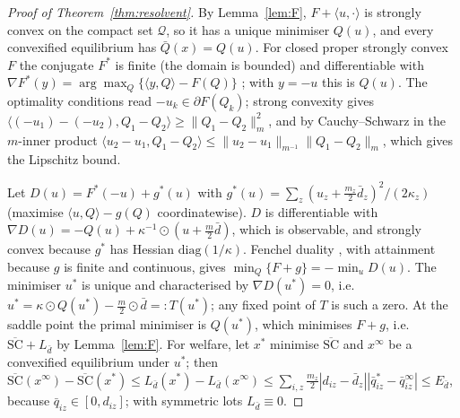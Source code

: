 \documentclass[preprint,12pt]{elsarticle}
\theoremstyle{definition}
\theoremstyle{remark}
\newcommand{\ip}[2]{\langle #1,#2\rangle}
\newcommand{\cQ}{\mathcal{Q}}
\begin{document}
\begin{proof}[Proof of Theorem~\ref{thm:resolvent}]
By Lemma~\ref{lem:F}, $F+\ip u\cdot$ is strongly convex on the compact set $\cQ$, so it has a unique minimiser $Q(u)$, and every convexified equilibrium has $\bar Q(x)=Q(u)$. For closed proper strongly convex $F$ the conjugate $F^*$ is finite (the domain is bounded) and differentiable with $\nabla F^*(y)=\arg\max_Q\{\ip yQ-F(Q)\}$ \citep[Theorem 26.3]{Rockafellar1970}; with $y=-u$ this is $Q(u)$. The optimality conditions read $-u_k\in\partial F(Q_k)$; strong convexity gives $\ip{(-u_1)-(-u_2)}{Q_1-Q_2}\ge\|Q_1-Q_2\|_m^2$, and by Cauchy--Schwarz in the $m$-inner product $\ip{u_2-u_1}{Q_1-Q_2}\le\|u_2-u_1\|_{m^{-1}}\|Q_1-Q_2\|_m$, which gives the Lipschitz bound.

Let $D(u)=F^*(-u)+g^*(u)$ with $g^*(u)=\sum_z(u_z+\tfrac{m_z}{2}\bar d_z)^2/(2\kappa_z)$ (maximise $\ip uQ-g(Q)$ coordinatewise). $D$ is differentiable with $\nabla D(u)=-Q(u)+\kappa^{-1}\odot(u+\tfrac m2\bar d)$, which is observable, and strongly convex because $g^*$ has Hessian $\mathrm{diag}(1/\kappa)$. Fenchel duality \citep[Corollary 31.2.1]{Rockafellar1970}, with attainment because $g$ is finite and continuous, gives $\min_Q\{F+g\}=-\min_uD(u)$. The minimiser $u^*$ is unique and characterised by $\nabla D(u^*)=0$, i.e.\ $u^*=\kappa\odot Q(u^*)-\tfrac m2\odot\bar d=:T(u^*)$; any fixed point of $T$ is such a zero. At the saddle point the primal minimiser is $Q(u^*)$, which minimises $F+g$, i.e.\ $\overline{\mathrm{SC}}+L_{\bar d}$ by Lemma~\ref{lem:F}. For welfare, let $x^*$ minimise $\overline{\mathrm{SC}}$ and $x^\infty$ be a convexified equilibrium under $u^*$; then $\overline{\mathrm{SC}}(x^\infty)-\overline{\mathrm{SC}}(x^*)\le L_{\bar d}(x^*)-L_{\bar d}(x^\infty)\le\sum_{i,z}\tfrac{m_z}{2}|d_{iz}-\bar d_z||\bar q^*_{iz}-\bar q^\infty_{iz}|\le E_{\bar d}$, because $\bar q_{iz}\in[0,d_{iz}]$; with symmetric lots $L_{\bar d}\equiv0$.
\end{proof}
\end{document}

